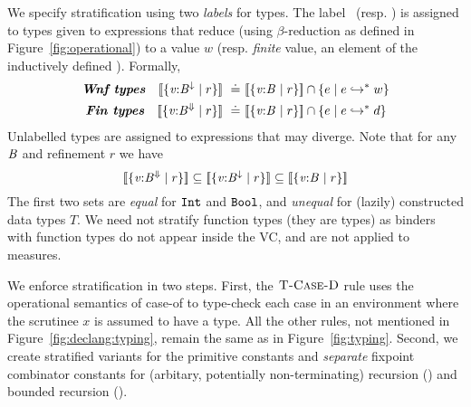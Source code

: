We specify stratification using two \emph{labels} for types.
%
The label \trivial\ (resp. \finite) is assigned to types given 
to expressions that reduce (using $\beta$-reduction as defined in Figure~\ref{fig:operational})  
to a value $w$ (resp. \emph{finite} value,
\ie an element of the inductively defined \dom).
%
Formally,
%
\begin{align}
  \mbox{\emphbf{\Wnf types}} \quad 
\interp{\tref{\vv}{\Base}{\trivial}{r}} \defeq & 
    \interp{\tref{\vv}{\Base}{}{r}} \cap \{ e \mid \evals{e}{w} \}
    \label{eq:trivial} \\
  \mbox{\emphbf{\Fin types}} \quad 
\interp{\tref{\vv}{\Base}{\finite}{r}} \defeq & 
    \interp{\tref{\vv}{\Base}{}{r}} \cap \{ e \mid \evals{e}{d} \} 
    \label{eq:finite} 
\end{align}
%
Unlabelled types are assigned to expressions that may diverge.
%
Note that for any $\mathit{B}$ and refinement $r$ we have
$$
\interp{\tref{\vv}{\Base}{\finite}{r}} \subseteq
\interp{\tref{\vv}{\Base}{\trivial}{r}} \subseteq
\interp{\tref{\vv}{\Base}{}{r}}
$$ 
%
The first two sets are \emph{equal} for $\mathtt{Int}$ and $\mathtt{Bool}$, 
and \emph{unequal} for (lazily) constructed data types $T$. 
%
We need not stratify function types (\ie they are \Div types)
as binders with function types do not appear inside the VC, and 
are not applied to measures.

\label{sec:typing:termination}
%
We enforce stratification in two steps.
%
First, the $\textsc{T-Case-D}$ rule uses the operational semantics of case-of to 
type-check each case in an environment where the scrutinee
$x$ is assumed to have a \Wnf type. 
%
All the other rules, not mentioned in Figure~\ref{fig:declang:typing},
remain the same as in Figure~\ref{fig:typing}.
%
Second, we create stratified variants for the primitive constants 
and \emph{separate} fixpoint combinator constants for 
(arbitary, potentially non-terminating) recursion (\efix{}) 
and bounded recursion (\etfix{}).

